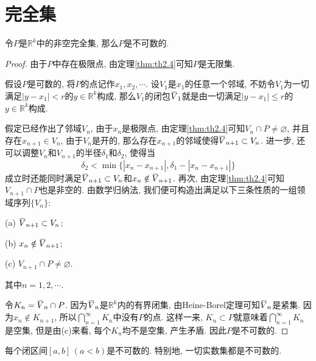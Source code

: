 \documentclass[cn,12pt,math=mtpro2,citestyle=gb7714-2015,bibstyle=gb7714-2015,twocol]{elegantbook}
\newcommand{\R}{\mathbb{R}}
\newcommand{\bx}{x}
\newcommand{\y}{y}
\newcommand{\overbar}[1]{\mkern 1.5mu\overline{\mkern-1.5mu#1\mkern-1.5mu}\mkern 1.5mu}
\let\emptyset\varnothing
\begin{document}
\section{完全集}
\begin{theorem}
  令$P$是$\R^k$中的非空完全集, 那么$P$是不可数的.
\end{theorem}
\begin{proof}
  由于$P$中存在极限点, 由定理\ref{thm:th2.4}可知$P$是无限集.

  假设$P$是可数的, 将$P$的点记作$\bx_1,\bx_2,\cdots$. 设$V_1$是$\bx_1$的任意一个邻域, 不妨令$V_1$为一切满足$|\y -\bx_1|<r$的$\y \in \R^k$构成, 那么$V_1$的闭包$\overbar{V}_1$就是由一切满足$|\y -\bx_1|\leq r$的$\y \in\R^k$构成.

  假定已经作出了邻域$V_n$, 由于$\bx_n$是极限点, 由定理\ref{thm:th2.4}可知$V_n\cap P\neq\emptyset$, 并且存在$\bx_{n+1} \in V_n$, 由于$V_n$是开的, 那么存在$\bx_ {n+1}$的邻域使得$\overbar{V}_{n+1}\subset V_n$. 进一步, 还可以调整$V_n$和$V_{n+1}$的半径$\delta_1$和$\delta_2$, 使得当
  $$\delta_2<\min\{|\bx_n-\bx_{n+1}|,\delta_1- |\bx_n-\bx_{n+1}|\}$$
  成立时还能同时满足$\overbar{V}_{n+1}\subset V_n$和$\bx_n\notin \overbar{V}_{n+1}$. 再次,  由定理\ref{thm:th2.4}可知$V_{n+1}\cap P$也是非空的. 由数学归纳法, 我们便可构造出满足以下三条性质的一组领域序列$\{V_\alpha\}$:

  (a) $\overbar{V}_{n+1}\subset V_n$;

  (b) $x_n\notin \overbar{V}_{n+1}$;

  (c) $V_{n+1}\cap P\neq\emptyset$.

\noindent 其中$n=1,2,\cdots$.

  令$K_n=\overbar{V}_{n}\cap P$. 因为$\overbar{V}_n$是$\R^k$内的有界闭集, 由Heine-Borel定理可知$\overbar{V}_n$是紧集. 因为$x_n\notin K_{n+1}$, 所以$ \bigcap_{n=1}^\infty K_n$中没有$P$的点. 这样一来, $K_n\subset P$就意味着$ \bigcap_{n=1}^\infty K_n$是空集, 但是由(c)来看, 每个$K_n$均不是空集, 产生矛盾. 因此$P$是不可数的.

\end{proof}
\begin{corollary}
每个闭区间$[a,b]\,(a<b)$是不可数的. 特别地, 一切实数集都是不可数的.
\end{corollary}
\end{document}
